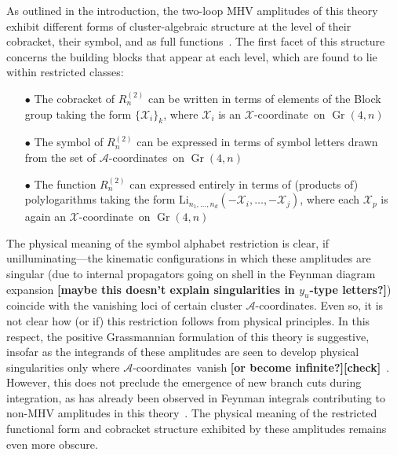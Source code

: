 \documentclass[11pt]{article}
\DeclareMathOperator{\Gr}{Gr}
\def\x{\mathcal{X}}
\def\xcoord{$\mathcal{X}$-coordinate}
\def\acoords{$\mathcal{A}$-coordinates}
\def\draftnote#1{{\bf [#1]}}
\begin{document}
As outlined in the introduction, the two-loop MHV amplitudes of this theory exhibit different forms of cluster-algebraic structure at the level of their cobracket, their symbol, and as full functions~\cite{Golden:2013xva,Golden:2014xqa,Golden:2014xqf,Golden:2014pua}. The first facet of this structure concerns the building blocks that appear at each level, which are found to lie within restricted classes:
\begin{itemize}
\item[$\bullet$] The cobracket of $R^{(2)}_n$ can be written in terms of elements of the Block group taking the form $\{\mathcal{X}_i \}_k$, where $\x_i$ is an \xcoord\ on $\Gr(4,n)$
\item[$\bullet$] The symbol of $R^{(2)}_n$ can be expressed in terms of symbol letters drawn from the set of \acoords\ on $\Gr(4,n)$
\item[$\bullet$] The function $R^{(2)}_n$ can expressed entirely in terms of (products of) polylogarithms taking the form $\text{Li}_{n_1,\dots,n_d}(-\mathcal{X}_i,\dots,-\mathcal{X}_j)$, where each $\x_p$ is again an \xcoord\ on $\Gr(4,n)$
\end{itemize}
The physical meaning of the symbol alphabet restriction is clear, if unilluminating---the kinematic configurations in which these amplitudes are singular (due to internal propagators going on shell in the Feynman diagram expansion \draftnote{maybe this doesn't explain singularities in $y_u$-type letters?}) coincide with the vanishing loci of certain cluster \acoords. Even so, it is not clear how (or if) this restriction follows from physical principles. In this respect, the positive Grassmannian formulation of this theory is suggestive, insofar as the integrands of these amplitudes are seen to develop physical singularities only where \acoords\ vanish \draftnote{or become infinite?}\draftnote{check}~\cite{ArkaniHamed:2012nw}. However, this does not preclude the emergence of new branch cuts during integration, as has already been observed in Feynman integrals contributing to non-MHV amplitudes in this theory~\cite{Bourjaily:2018aeq,Henn:2018cdp}. The physical meaning of the restricted functional form and cobracket structure exhibited by these amplitudes remains even more obscure. 
\end{document}
